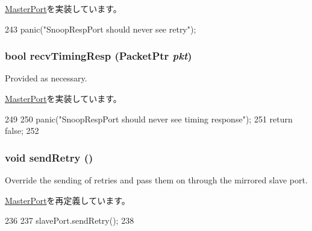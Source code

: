 \hyperlink{classMasterPort_ac1ccc3bcf7ebabb20b57fab99b2be5b0}{MasterPort}を実装しています。


\begin{DoxyCode}
243 { panic("SnoopRespPort should never see retry\n"); }
\end{DoxyCode}
\hypertarget{classCoherentBus_1_1SnoopRespPort_a482dba5588f4bee43e498875a61e5e0b}{
\subsubsection[{recvTimingResp}]{\setlength{\rightskip}{0pt plus 5cm}bool recvTimingResp ({\bf PacketPtr} {\em pkt})}}
\label{classCoherentBus_1_1SnoopRespPort_a482dba5588f4bee43e498875a61e5e0b}
Provided as necessary. 

\hyperlink{classMasterPort_abd323548d6c93f8b0543f1fe3a86ca35}{MasterPort}を実装しています。


\begin{DoxyCode}
249         {
250             panic("SnoopRespPort should never see timing response\n");
251             return false;
252         }
\end{DoxyCode}
\hypertarget{classCoherentBus_1_1SnoopRespPort_a6172657b944e32a722d90a20c5896bb7}{
\subsubsection[{sendRetry}]{\setlength{\rightskip}{0pt plus 5cm}void sendRetry ()}}
\label{classCoherentBus_1_1SnoopRespPort_a6172657b944e32a722d90a20c5896bb7}
Override the sending of retries and pass them on through the mirrored slave port. 

\hyperlink{classMasterPort_a6172657b944e32a722d90a20c5896bb7}{MasterPort}を再定義しています。


\begin{DoxyCode}
236                          {
237             slavePort.sendRetry();
238         }
\end{DoxyCode}


